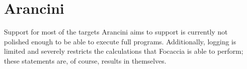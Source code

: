 \section{Arancini}

Support for most of the targets Arancini aims to support is currently not polished enough to be able to execute full
programs. Additionally, logging is limited and severely restricts the calculations that Focaccia is able to perform;
these statements are, of course, results in themselves.
